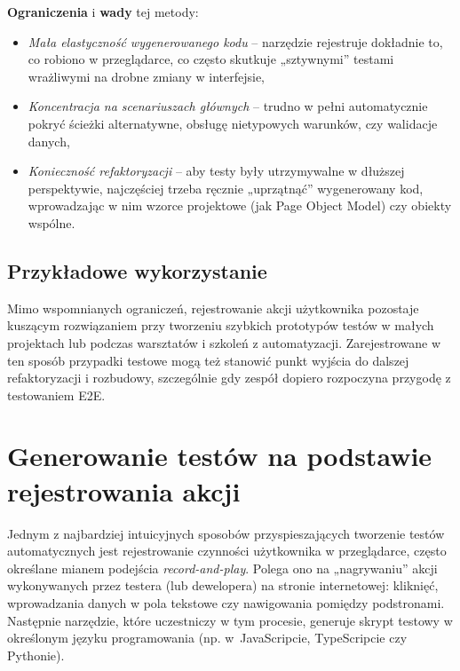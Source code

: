 \documentclass[12pt]{report}
\begin{document}
\noindent\textbf{Ograniczenia} i \textbf{wady} tej metody:
\begin{itemize}
    \item \emph{Mała elastyczność wygenerowanego kodu} -- narzędzie rejestruje dokładnie to, co robiono w przeglądarce, co często skutkuje „sztywnymi” testami wrażliwymi na drobne zmiany w interfejsie,
    \item \emph{Koncentracja na scenariuszach głównych} -- trudno w pełni automatycznie pokryć ścieżki alternatywne, obsługę nietypowych warunków, czy walidacje danych,
    \item \emph{Konieczność refaktoryzacji} -- aby testy były utrzymywalne w dłuższej perspektywie, najczęściej trzeba ręcznie „uprzątnąć” wygenerowany kod, wprowadzając w nim wzorce projektowe (jak Page Object Model) czy obiekty wspólne.
\end{itemize}

\subsection*{Przykładowe wykorzystanie}
Mimo wspomnianych ograniczeń, rejestrowanie akcji użytkownika pozostaje kuszącym rozwiązaniem przy tworzeniu szybkich prototypów testów w małych projektach lub podczas warsztatów i szkoleń z automatyzacji. Zarejestrowane w ten sposób przypadki testowe mogą też stanowić punkt wyjścia do dalszej refaktoryzacji i rozbudowy, szczególnie gdy zespół dopiero rozpoczyna przygodę z testowaniem E2E.


\section{Generowanie testów na podstawie rejestrowania akcji}
\label{sec:generowanie-rejestrowanie}

Jednym z najbardziej intuicyjnych sposobów przyspieszających tworzenie testów automatycznych jest rejestrowanie czynności użytkownika w przeglądarce, często określane mianem podejścia \emph{record-and-play}. Polega ono na „nagrywaniu” akcji wykonywanych przez testera (lub dewelopera) na stronie internetowej: kliknięć, wprowadzania danych w pola tekstowe czy nawigowania pomiędzy podstronami. Następnie narzędzie, które uczestniczy w tym procesie, generuje skrypt testowy w określonym języku programowania (np. w~JavaScripcie, TypeScripcie czy Pythonie). 
\end{document}
